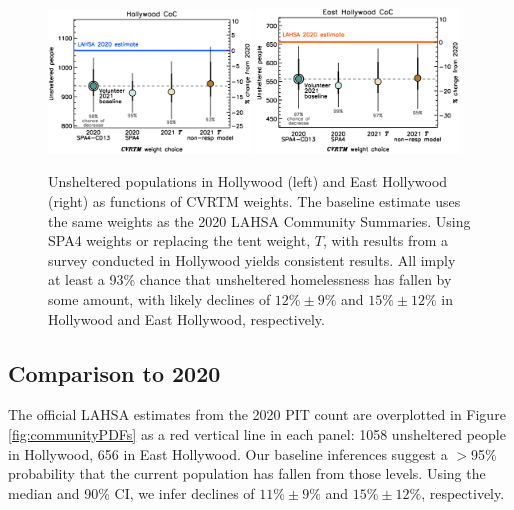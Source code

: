 \documentclass[11pt,twocolumn]{article}
\def\resp{respectively}
\begin{document}
\begin{figure}[]
	\centering
	\includegraphics[width = 0.48\textwidth, trim = 0cm 0.5cm 0cm 0cm]{hwoodFinal}
	\includegraphics[width = 0.48\textwidth, trim = 0cm 0.5cm 0cm 0cm]{ehoFinal}	
	\caption{Unsheltered populations in Hollywood (left) and East Hollywood (right) 
			as functions of CVRTM weights. The baseline estimate uses the same weights as the 
			2020 LAHSA Community Summaries. Using SPA4 weights or replacing the tent 
			weight, $T$, with results from a survey conducted in Hollywood yields consistent
			results. All imply at least a 93\% chance that unsheltered homelessness has fallen
			by some amount, with likely declines of $12\%\pm9\%$ and $15\%\pm12\%$
			in Hollywood and East Hollywood, \resp.}
	\label{fig:wtComp}
\end{figure}



\subsection{Comparison to 2020}
\label{sec:comp}

The official LAHSA estimates from the 2020 PIT count are overplotted in Figure \ref{fig:communityPDFs} 
as a red vertical line in each panel: 1058 unsheltered people in Hollywood, 656 in East Hollywood.
Our baseline inferences suggest a $>$95\% probability that the current population has fallen from 
those levels. Using the median and 90\% CI, we infer declines of $11\%\pm9\%$ and $15\%\pm12\%$, \resp. 
\end{document}
